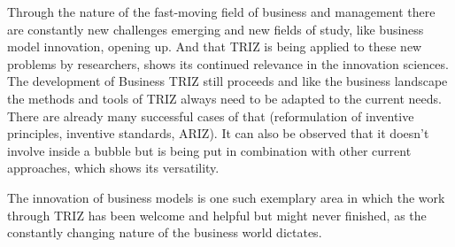 \documentclass[11pt,a4paper]{article}
\begin{document}
Through the nature of the fast-moving field of business and management there
are constantly new challenges emerging and new fields of study, like business
model innovation, opening up. And that TRIZ is being applied to these new
problems by researchers, shows its continued relevance in the innovation
sciences. The development of Business TRIZ still proceeds and like the
business landscape the methods and tools of TRIZ always need to be adapted to
the current needs. There are already many successful cases of that
(reformulation of inventive principles, inventive standards, ARIZ). It can
also be observed that it doesn’t involve inside a bubble but is being put in
combination with other current approaches, which shows its versatility.

The innovation of business models is one such exemplary area in which the work
through TRIZ has been welcome and helpful but might never finished, as the
constantly changing nature of the business world dictates.
\end{document}
